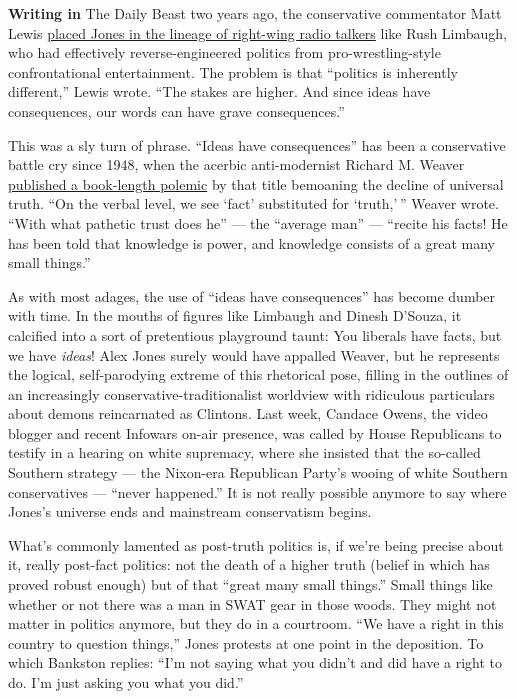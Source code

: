 \textbf{Writing in} The Daily Beast two years ago, the conservative
commentator Matt Lewis
\href{https://www.thedailybeast.com/alex-jones-youre-a-real-sicko}{placed
Jones in the lineage of right-wing radio talkers} like Rush Limbaugh,
who had effectively reverse-engineered politics from pro-wrestling-style
confrontational entertainment. The problem is that ``politics is
inherently different,'' Lewis wrote. ``The stakes are higher. And since
ideas have consequences, our words can have grave consequences.''

This was a sly turn of phrase. ``Ideas have consequences'' has been a
conservative battle cry since 1948, when the acerbic anti-modernist
Richard M. Weaver
\href{https://www.press.uchicago.edu/ucp/books/book/chicago/I/bo17116688.html}{published
a book-length polemic} by that title bemoaning the decline of universal
truth. ``On the verbal level, we see `fact' substituted for `truth,' ''
Weaver wrote. ``With what pathetic trust does he'' --- the ``average
man'' --- ``recite his facts! He has been told that knowledge is power,
and knowledge consists of a great many small things.''

As with most adages, the use of ``ideas have consequences'' has become
dumber with time. In the mouths of figures like Limbaugh and Dinesh
D'Souza, it calcified into a sort of pretentious playground taunt: You
liberals have facts, but we have \emph{ideas}! Alex Jones surely would
have appalled Weaver, but he represents the logical, self-parodying
extreme of this rhetorical pose, filling in the outlines of an
increasingly conservative-traditionalist worldview with ridiculous
particulars about demons reincarnated as Clintons. Last week, Candace
Owens, the video blogger and recent Infowars on-air presence, was called
by House Republicans to testify in a hearing on white supremacy, where
she insisted that the so-called Southern strategy --- the Nixon-era
Republican Party's wooing of white Southern conservatives --- ``never
happened.'' It is not really possible anymore to say where Jones's
universe ends and mainstream conservatism begins.

What's commonly lamented as post-truth politics is, if we're being
precise about it, really post-fact politics: not the death of a higher
truth (belief in which has proved robust enough) but of that ``great
many small things.'' Small things like whether or not there was a man in
SWAT gear in those woods. They might not matter in politics anymore, but
they do in a courtroom. ``We have a right in this country to question
things,'' Jones protests at one point in the deposition. To which
Bankston replies: ``I'm not saying what you didn't and did have a right
to do. I'm just asking you what you did.''

